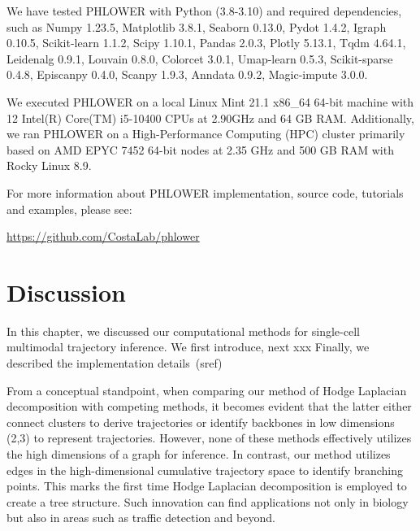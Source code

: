We have tested PHLOWER with Python (3.8-3.10) and required dependencies, such as Numpy 1.23.5, Matplotlib 3.8.1, Seaborn 0.13.0, Pydot 1.4.2, Igraph 0.10.5, Scikit-learn 1.1.2, Scipy 1.10.1, Pandas 2.0.3, Plotly 5.13.1, Tqdm 4.64.1, Leidenalg 0.9.1, Louvain 0.8.0, Colorcet 3.0.1, Umap-learn 0.5.3, Scikit-sparse 0.4.8, Episcanpy 0.4.0, Scanpy 1.9.3, Anndata 0.9.2, Magic-impute 3.0.0.

We executed PHLOWER on a local Linux Mint 21.1 x86\_64 64-bit machine with 12 Intel(R) Core(TM) i5-10400 CPUs at 2.90GHz and 64 GB RAM. Additionally, we ran PHLOWER on a High-Performance Computing (HPC) cluster primarily based on AMD EPYC 7452 64-bit nodes at 2.35 GHz and 500 GB RAM with Rocky Linux 8.9.

For more information about PHLOWER implementation, source code, tutorials and examples, please see:
\begin{center}
\url{https://github.com/CostaLab/phlower}
\end{center}

\section{Discussion}
\label{TI_methods:discussion}
In this chapter, we discussed our computational methods for single-cell multimodal trajectory inference. We first introduce, next xxx
Finally, we described the implementation details~(sref{})

From a conceptual standpoint, when comparing our method of Hodge Laplacian decomposition with competing methods, it becomes evident that the latter either connect clusters to derive trajectories or identify backbones in low dimensions (2,3) to represent trajectories. However, none of these methods effectively utilizes the high dimensions of a graph for inference. In contrast, our method utilizes edges in the high-dimensional cumulative trajectory space to identify branching points. This marks the first time Hodge Laplacian decomposition is employed to create a tree structure. Such innovation can find applications not only in biology but also in areas such as traffic detection and beyond.

